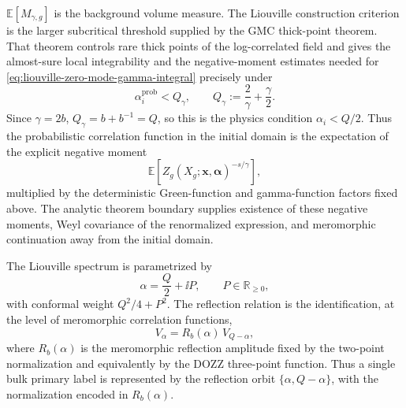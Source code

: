 \(\mathbb E[M_{\gamma,g}]\) is the background volume measure.  The Liouville
construction criterion is the larger subcritical threshold supplied by the
GMC thick-point theorem.  That theorem controls rare thick points of the
log-correlated field and gives the almost-sure local integrability and the
negative-moment estimates needed for
\eqref{eq:liouville-zero-mode-gamma-integral} precisely under
\[
  \alpha_i^{\mathrm{prob}}<Q_\gamma,
  \qquad
  Q_\gamma:=\frac2\gamma+\frac{\gamma}{2}.
\]
Since \(\gamma=2b\), \(Q_\gamma=b+b^{-1}=Q\), so this is the physics
condition \(\alpha_i<Q/2\).  Thus the probabilistic correlation function in
the initial domain is the expectation of the explicit negative moment
\[
  \mathbb E\!\left[
    Z_g(X_g;\boldsymbol x,\boldsymbol\alpha)^{-s/\gamma}
  \right],
\]
multiplied by the deterministic Green-function and gamma-function factors
fixed above.  The analytic theorem boundary supplies existence of these
negative moments, Weyl covariance of the renormalized expression, and
meromorphic continuation away from the initial domain.

\begin{definition}
\label{def:liouville-reflection-relation}
The Liouville spectrum is parametrized by
\[
  \alpha=\frac Q2+\ii P,\qquad P\in\mathbb R_{\ge0},
\]
with conformal weight \(Q^2/4+P^2\).  The reflection relation is the
identification, at the level of meromorphic correlation functions,
\begin{equation}
  V_\alpha=R_b(\alpha)\,V_{Q-\alpha},
  \label{eq:liouville-reflection-relation}
\end{equation}
where \(R_b(\alpha)\) is the meromorphic reflection amplitude fixed by the
two-point normalization and equivalently by the DOZZ three-point function.
Thus a single bulk primary label is represented by the reflection orbit
\(\{\alpha,Q-\alpha\}\), with the normalization encoded in \(R_b(\alpha)\).
\end{definition}

